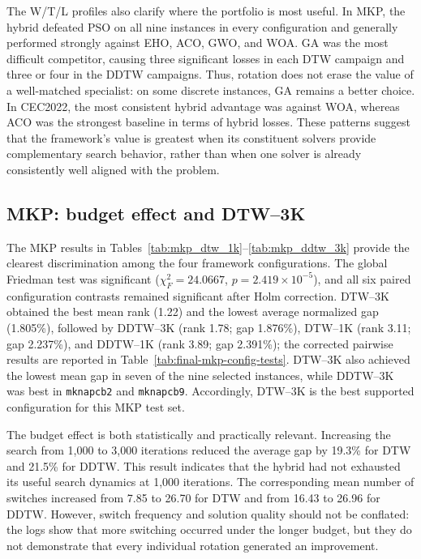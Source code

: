 The W/T/L profiles also clarify where the portfolio is most useful. In MKP, the
hybrid defeated PSO on all nine instances in every configuration and generally
performed strongly against EHO, ACO, GWO, and WOA. GA was the most difficult
competitor, causing three significant losses in each DTW campaign and three or
four in the DDTW campaigns. Thus, rotation does not erase the value of a
well-matched specialist: on some discrete instances, GA remains a better choice.
In CEC2022, the most consistent hybrid advantage was against WOA, whereas ACO
was the strongest baseline in terms of hybrid losses. These patterns suggest
that the framework's value is greatest when its constituent solvers provide
complementary search behavior, rather than when one solver is already
consistently well aligned with the problem.

\subsection{MKP: budget effect and DTW--3K}
\label{sec:discussion-mkp}

The MKP results in Tables~\ref{tab:mkp_dtw_1k}--\ref{tab:mkp_ddtw_3k}
provide the clearest discrimination among the four framework configurations.
The global Friedman test was significant
($\chi_F^2=24.0667$, $p=2.419\times10^{-5}$), and all six paired configuration
contrasts remained significant after Holm correction. DTW--3K obtained the
best mean rank (1.22) and the lowest average normalized gap (1.805\%), followed
by DDTW--3K (rank 1.78; gap 1.876\%), DTW--1K (rank 3.11; gap 2.237\%), and
DDTW--1K (rank 3.89; gap 2.391\%); the corrected pairwise results are reported
in Table~\ref{tab:final-mkp-config-tests}. DTW--3K also achieved the lowest mean gap in
seven of the nine selected instances, while DDTW--3K was best in
\texttt{mknapcb2} and \texttt{mknapcb9}. Accordingly, DTW--3K is the best
supported configuration for this MKP test set.

The budget effect is both statistically and practically relevant. Increasing
the search from 1,000 to 3,000 iterations reduced the average gap by 19.3\% for
DTW and 21.5\% for DDTW. This result indicates that the hybrid had not exhausted
its useful search dynamics at 1,000 iterations. The corresponding mean number
of switches increased from 7.85 to 26.70 for DTW and from 16.43 to 26.96 for
DDTW. However, switch frequency and solution quality should not be conflated:
the logs show that more switching occurred under the longer budget, but they do
not demonstrate that every individual rotation generated an improvement.

